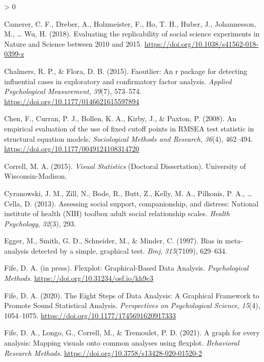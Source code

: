 \documentclass[
  english,
  man]{apa6}
\newlength{\cslhangindent}
\newenvironment{CSLReferences}[2] %
 {%
  \setlength{\parindent}{0pt}
  \ifodd #1 \everypar{\setlength{\hangindent}{\cslhangindent}}\ignorespaces\fi
  \ifnum #2 > 0
  \setlength{\parskip}{#2\baselineskip}
  \fi
 }%
 {}
\begin{document}
\begin{CSLReferences}{1}{0}
\leavevmode\hypertarget{ref-Camerer2018}{}%
Camerer, C. F., Dreber, A., Holzmeister, F., Ho, T. H., Huber, J., Johannesson, M., \ldots{} Wu, H. (2018). {Evaluating the replicability of social science experiments in Nature and Science between 2010 and 2015}. \url{https://doi.org/10.1038/s41562-018-0399-z}

\leavevmode\hypertarget{ref-faoutlier}{}%
Chalmers, R. P., \& Flora, D. B. (2015). Faoutlier: An r package for detecting influential cases in exploratory and confirmatory factor analysis. \emph{Applied Psychological Measurement}, \emph{39}(7), 573--574. \url{https://doi.org/10.1177/0146621615597894}

\leavevmode\hypertarget{ref-Chen2008}{}%
Chen, F., Curran, P. J., Bollen, K. A., Kirby, J., \& Paxton, P. (2008). {An empirical evaluation of the use of fixed cutoff points in RMSEA test statistic in structural equation models}. \emph{Sociological Methods and Research}, \emph{36}(4), 462--494. \url{https://doi.org/10.1177/0049124108314720}

\leavevmode\hypertarget{ref-Correll2015}{}%
Correll, M. A. (2015). \emph{{Visual Statistics}} (Doctoral Dissertation). University of Wisconsin-Madison.

\leavevmode\hypertarget{ref-cyranowski2013assessing}{}%
Cyranowski, J. M., Zill, N., Bode, R., Butt, Z., Kelly, M. A., Pilkonis, P. A., \ldots{} Cella, D. (2013). Assessing social support, companionship, and distress: National institute of health (NIH) toolbox adult social relationship scales. \emph{Health Psychology}, \emph{32}(3), 293.

\leavevmode\hypertarget{ref-egger1997bias}{}%
Egger, M., Smith, G. D., Schneider, M., \& Minder, C. (1997). Bias in meta-analysis detected by a simple, graphical test. \emph{Bmj}, \emph{315}(7109), 629--634.

\leavevmode\hypertarget{ref-Fife2019c}{}%
Fife, D. A. (in press). {Flexplot: Graphical-Based Data Analysis}. \emph{Psychological Methods}. \url{https://doi.org/10.31234/osf.io/kh9c3}

\leavevmode\hypertarget{ref-Fife2019e}{}%
Fife, D. A. (2020). {The Eight Steps of Data Analysis: A Graphical Framework to Promote Sound Statistical Analysis}. \emph{Perspectives on Psychological Science}, \emph{15}(4), 1054--1075. \url{https://doi.org/10.1177/1745691620917333}

\leavevmode\hypertarget{ref-Fifemapping}{}%
Fife, D. A., Longo, G., Correll, M., \& Tremoulet, P. D. (2021). A graph for every analysis: Mapping visuals onto common analyses using flexplot. \emph{Behavioral Research Methods}. \url{https://doi.org/10.3758/s13428-020-01520-2}


\end{CSLReferences}
\end{document}
